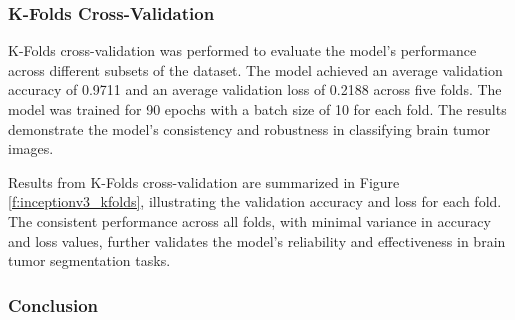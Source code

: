 \subsubsection{K-Folds Cross-Validation}

K-Folds cross-validation was performed to evaluate the model's performance across different subsets of the dataset. The model achieved an average validation accuracy of 0.9711 and an average validation loss of 0.2188 across five folds. The model was trained for 90 epochs with a batch size of 10 for each fold. The results demonstrate the model's consistency and robustness in classifying brain tumor images.

Results from K-Folds cross-validation are summarized in Figure \ref{f:inceptionv3_kfolds}, illustrating the validation accuracy and loss for each fold. The consistent performance across all folds, with minimal variance in accuracy and loss values, further validates the model's reliability and effectiveness in brain tumor segmentation tasks.



\subsubsection{Conclusion}


